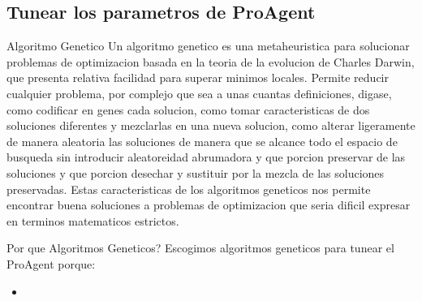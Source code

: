 \documentclass{beamer}
\begin{document}
\subsection{Tunear los parametros de ProAgent}
\begin{frame}{Algoritmo Genetico}
    Un algoritmo genetico es una metaheuristica para solucionar problemas de optimizacion basada en la teoria de la evolucion de Charles Darwin, que presenta relativa facilidad para superar minimos locales. Permite reducir cualquier problema, por complejo que sea a unas cuantas definiciones, digase, como codificar en genes cada solucion, como tomar caracteristicas de dos soluciones diferentes y mezclarlas en una nueva solucion, como alterar ligeramente de manera aleatoria las soluciones de manera que se alcance todo el espacio de busqueda sin introducir aleatoreidad abrumadora y que porcion preservar de las soluciones y que porcion desechar y sustituir por la mezcla de las soluciones preservadas.
    Estas caracteristicas de los algoritmos geneticos nos permite encontrar buena soluciones a problemas de optimizacion que seria dificil expresar en terminos matematicos estrictos.
\end{frame}

\begin{frame}{Por que Algoritmos Geneticos?}
    Escogimos algoritmos geneticos para tunear el ProAgent porque:
    \begin{itemize}
        \item 
    \end{itemize}
\end{frame}
\end{document}
